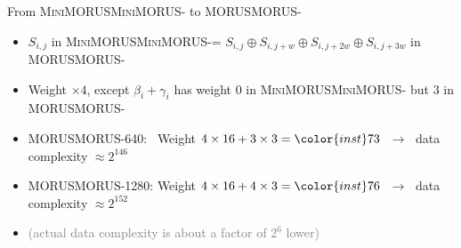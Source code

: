 \documentclass[aspectratio=169,table]{beamer}
\renewcommand{\emph}[1]{{\color{inst}#1}}
\newcommand{\sn}[1]{\textcolor{gray}{\small #1}}
\newcommand{\cipher}[1]{\textsc{#1}}
\newcommand{\MORUS}[1][]{\ifx\relax#1\relax\cipher{MORUS}\else\cipher{MORUS-#1}\fi\xspace}
\newcommand{\MiniMORUS}[1][]{\ifx\relax#1\relax\cipher{MiniMORUS}\else\cipher{MiniMORUS-#1}\fi\xspace}
\begin{document}
\begin{frame}{From \MiniMORUS to \MORUS}%
  \begin{itemize}
    \item 
         \structure{=}
         \structure{+}
         \structure{+}
         \structure{+}

      $S_{i,j}$ in \MiniMORUS = $S_{i,j} \oplus S_{i,j + w} \oplus S_{i,j + 2w} \oplus S_{i,j + 3w}$ in \MORUS
      \bigskip
    \item Weight $\times 4$\pause, except $\beta_i + \gamma_i$ has weight 0 in \MiniMORUS but 3 in \MORUS
      \bigskip
    \item[\faArrowCircleRight] \MORUS[640]:~ Weight $4 \times 16 + 3 \times 3 = \emph{73}$
      $\;\to\;$ data complexity $\approx 2^{146}$ \hfill\faFrownO
    \item[\faArrowCircleRight] \MORUS[1280]: Weight $4 \times 16 + 4 \times 3 = \emph{76}$
      $\;\to\;$ data complexity $\approx 2^{152}$ \hfill{}%
      \bigskip
    \item \sn{(actual data complexity is about a factor of $2^6$ lower)}
  \end{itemize}
\end{frame}%
\end{document}
